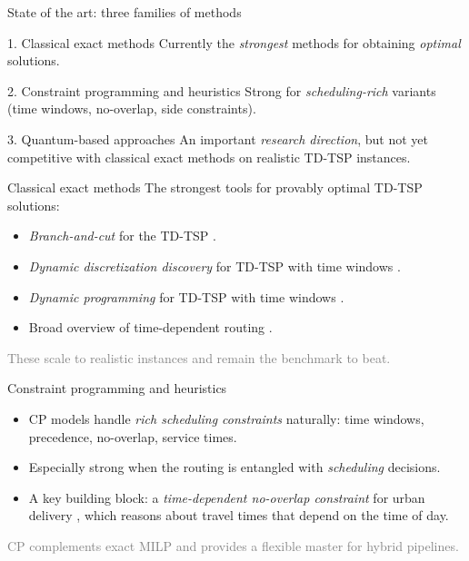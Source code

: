 \documentclass[
11pt,notheorems,hyperref={pdfauthor=Alma Arevalo Loyola}
]{beamer}
\renewcommand{\emphasize}[1]{\textcolor{emphasisblue}{\textit{#1}}}
\newcommand{\emphteal}[1]{\textcolor{emphasisteal}{\textit{#1}}}
\begin{document}
\begin{frame}{State of the art: three families of methods}
  \small
  \begin{block}{1. Classical exact methods}
    Currently the \emphasize{strongest} methods for obtaining \emphasize{optimal} solutions.
  \end{block}
  \begin{block}{2. Constraint programming and heuristics}
    Strong for \emphteal{scheduling-rich} variants (time windows, no-overlap, side constraints).
  \end{block}
  \begin{block}{3. Quantum-based approaches}
    An important \emphteal{research direction}, but \alert{not yet competitive} with classical exact methods on realistic TD-TSP instances.
  \end{block}
\end{frame}

\begin{frame}{Classical exact methods}
  The strongest tools for provably optimal TD-TSP solutions:
  \begin{itemize}
    \item \emphasize{Branch-and-cut} for the TD-TSP \cite{cordeau2014analysis}.
    \item \emphasize{Dynamic discretization discovery} for TD-TSP with time windows \cite{vu2020dynamic}.
    \item \emphasize{Dynamic programming} for TD-TSP with time windows \cite{lera2022dynamic}.
    \item Broad overview of time-dependent routing \cite{gendreau2015time}.
  \end{itemize}
  \vspace{0.4em}
  \textcolor{gray}{These scale to realistic instances and remain the benchmark to beat.}
\end{frame}

\begin{frame}{Constraint programming and heuristics}
  \begin{itemize}
    \item CP models handle \emphteal{rich scheduling constraints} naturally: time windows, precedence, no-overlap, service times.
    \item Especially strong when the routing is entangled with \emphteal{scheduling} decisions.
    \item A key building block: a \emphasize{time-dependent no-overlap constraint} for urban delivery \cite{aguiar2015time}, which reasons about travel times that depend on the time of day.
  \end{itemize}
  \vspace{0.4em}
  \textcolor{gray}{CP complements exact MILP and provides a flexible master for hybrid pipelines.}
\end{frame}
\end{document}
